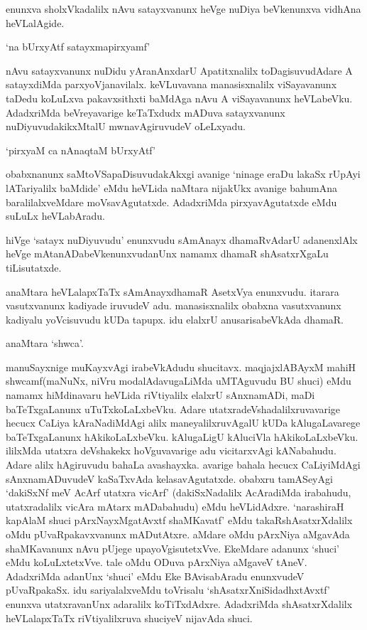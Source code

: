 enunxva sholxVkadalilx nAvu satayxvanunx heVge nuDiya beVkenunxva vidhAna heVLalAgide.

\begin{shloka}
`na bUrxyAtf satayxmapirxyamf'
\end{shloka}

nAvu satayxvanunx nuDidu yAranAnxdarU Apatitxnalilx toDagisuvudAdare A satayxdiMda parxyoVjanavilalx. keVLuvavana manasisxnalilx viSayavanunx taDedu koLuLxva pakavxsithxti baMdAga nAvu A viSayavanunx heVLabeVku. AdadxriMda beVreyavarige keTaTxdudx mADuva satayxvanunx nuDiyuvudakikxMtalU mwnavAgiruvudeV oLeLxyadu.

\begin{shloka}
`pirxyaM ca nAnaqtaM bUrxyAtf'
\end{shloka}

obabxnanunx saMtoVSapaDisuvudakAkxgi avanige `ninage eraDu lakaSx rUpAyi lATariyalilx baMdide' eMdu heVLida naMtara nijakUkx avanige bahumAna baralilalxveMdare moVsavAgutatxde. AdadxriMda pirxyavAgutatxde eMdu suLuLx heVLabAradu.

hiVge `satayx nuDiyuvudu' enunxvudu sAmAnayx dhamaRvAdarU adanenxlAlx heVge mAtanADabeVkenunxvudanUnx namamx dhamaR shAsatxrXgaLu tiLisutatxde.

anaMtara heVLalapxTaTx sAmAnayxdhamaR AsetxVya enunxvudu. itarara vasutxvanunx kadiyade iruvudeV adu. manasisxnalilx obabxna vasutxvanunx kadiyalu yoVcisuvudu kUDa tapupx. idu elalxrU anusarisabeVkAda dhamaR.

anaMtara `shwca'.

manuSayxnige muKayxvAgi irabeVkAdudu shucitavx. maqjajxlABAyxM mahiH shwcamf(maNuNx, niVru modalAdavugaLiMda uMTAguvudu BU shuci) eMdu namamx hiMdinavaru heVLida riVtiyalilx elalxrU sAnxnamADi, maDi baTeTxgaLanunx uTuTxkoLaLxbeVku. Adare utatxradeVshadalilxruvavarige hecucx CaLiya kAraNadiMdAgi alilx maneyalilxruvAgalU kUDa kAlugaLavarege baTeTxgaLanunx hAkikoLaLxbeVku. kAlugaLigU kAluciVla hAkikoLaLxbeVku. ililxMda utatxra deVshakekx hoVguvavarige adu vicitarxvAgi kANabahudu. Adare alilx hAgiruvudu bahaLa avashayxka. avarige bahala hecucx CaLiyiMdAgi sAnxnamADuvudeV kaSaTxvAda kelasavAgutatxde. obabxru tamASeyAgi `dakiSxNf meV AcArf utatxra vicArf' (dakiSxNadalilx AcAradiMda irabahudu, utatxradalilx vicAra mAtarx mADabahudu) eMdu heVLidAdxre. `narashiraH kapAlaM shuci pArxNayxMgatAvxtf shaMKavatf' eMdu takaRshAsatxrXdalilx oMdu pUvaRpakavxvanunx mADutAtxre. aMdare oMdu pArxNiya aMgavAda shaMKavanunx nAvu pUjege upayoVgisutetxVve. EkeMdare adanunx `shuci' eMdu koLuLxtetxVve. tale oMdu ODuva pArxNiya aMgaveV tAneV. AdadxriMda adanUnx `shuci' eMdu Eke BAvisabAradu enunxvudeV pUvaRpakaSx. idu sariyalalxveMdu toVrisalu `shAsatxrXniSidadhxtAvxtf' enunxva utatxravanUnx adaralilx koTiTxdAdxre. AdadxriMda shAsatxrXdalilx heVLalapxTaTx riVtiyalilxruva shuciyeV nijavAda shuci.

